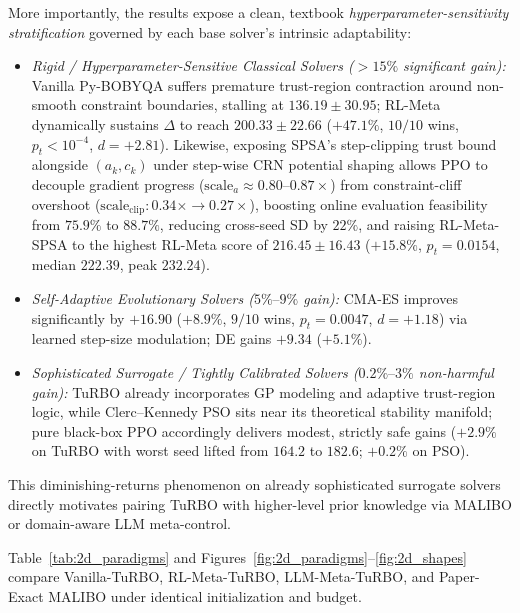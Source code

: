 \documentclass[11pt,fleqn,letterpaper]{article}
\begin{document}
More importantly, the results expose a clean, textbook \emph{hyperparameter-sensitivity stratification} governed by each base solver's intrinsic adaptability:
\begin{itemize}
\setlength{\itemsep}{1.5pt}\setlength{\parskip}{0pt}\setlength{\topsep}{2pt}
\item \emph{Rigid / Hyperparameter-Sensitive Classical Solvers ($>15\%$ significant gain):} Vanilla Py-BOBYQA suffers premature trust-region contraction around non-smooth constraint boundaries, stalling at $136.19 \pm 30.95$; RL-Meta dynamically sustains $\Delta$ to reach $200.33 \pm 22.66$ ($+47.1\%$, $10/10$ wins, $p_t < 10^{-4}$, $d = +2.81$). Likewise, exposing SPSA's step-clipping trust bound alongside $(a_k, c_k)$ under step-wise CRN potential shaping allows PPO to decouple gradient progress ($\text{scale}_a \approx 0.80$--$0.87\times$) from constraint-cliff overshoot ($\text{scale}_{\text{clip}}: 0.34\times \to 0.27\times$), boosting online evaluation feasibility from $75.9\%$ to $88.7\%$, reducing cross-seed SD by $22\%$, and raising RL-Meta-SPSA to the highest RL-Meta score of $216.45 \pm 16.43$ ($+15.8\%$, $p_t = 0.0154$, median $222.39$, peak $232.24$).
\item \emph{Self-Adaptive Evolutionary Solvers ($5\%\text{--}9\%$ gain):} CMA-ES improves significantly by $+16.90$ ($+8.9\%$, $9/10$ wins, $p_t = 0.0047$, $d = +1.18$) via learned step-size modulation; DE gains $+9.34$ ($+5.1\%$).
\item \emph{Sophisticated Surrogate / Tightly Calibrated Solvers ($0.2\%\text{--}3\%$ non-harmful gain):} TuRBO already incorporates GP modeling and adaptive trust-region logic, while Clerc--Kennedy PSO sits near its theoretical stability manifold; pure black-box PPO accordingly delivers modest, strictly safe gains ($+2.9\%$ on TuRBO with worst seed lifted from $164.2$ to $182.6$; $+0.2\%$ on PSO).
\end{itemize}
This diminishing-returns phenomenon on already sophisticated surrogate solvers directly motivates pairing TuRBO with higher-level prior knowledge via MALIBO or domain-aware LLM meta-control.

Table~\ref{tab:2d_paradigms} and Figures~\ref{fig:2d_paradigms}--\ref{fig:2d_shapes} compare Vanilla-TuRBO, RL-Meta-TuRBO, LLM-Meta-TuRBO, and Paper-Exact MALIBO under identical initialization and budget.
\end{document}

